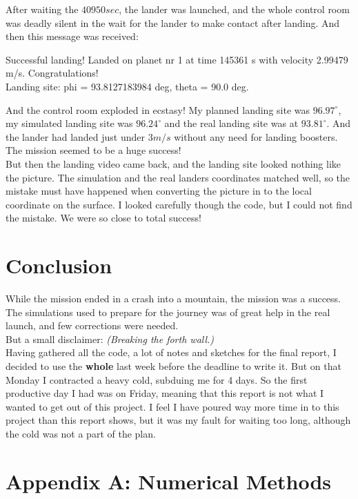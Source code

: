 \documentclass[a4paper, 10pt]{article}
\begin{document}
After waiting the $40950 sec$, the lander was launched, and the whole control room was deadly silent in the wait for the lander to make contact after landing. And then this message was received:

\begin{tcolorbox}
Successful landing! Landed on planet nr 1 at time 145361 s with velocity 2.99479 m/s. Congratulations! \\
Landing site: phi =  93.8127183984 deg,  theta =  90.0 deg.
\end{tcolorbox}

And the control room exploded in ecstasy! My planned landing site was $96.97^\circ$, my simulated landing site was $96.24^\circ$ and the real landing site was at $93.81^\circ$. And the lander had landed just under $3 m/s$ without any need for landing boosters. The mission seemed to be a huge success! \\

But then the landing video came back, and the landing site looked nothing like the picture. The simulation and the real landers coordinates matched well, so the mistake must have happened when converting the picture in to the local coordinate on the surface. I looked carefully though the code, but I could not find the mistake. We were so close to total success!  

\section{Conclusion}
While the mission ended in a crash into a mountain, the mission was a success. The simulations used to prepare for the journey was of great help in the real launch, and few corrections were needed. \\

But a small disclaimer: \textit{(Breaking the forth wall.)}\\
Having gathered all the code, a lot of notes and sketches for the final report, I decided to use the \textbf{whole} last week before the deadline to write it. But on that Monday I contracted a heavy cold, subduing me for 4 days. So the first productive day I had was on Friday, meaning that this report is not what I wanted to get out of this project. I feel I have poured way more time in to this project than this report shows, but it was my fault for waiting too long, although the cold was not a part of the plan. 

\section{Appendix A: Numerical Methods}
\end{document}

